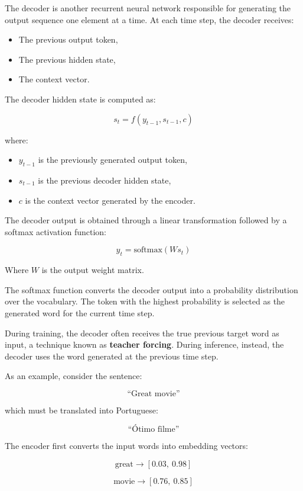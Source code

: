 The decoder is another recurrent neural network responsible for generating the output
sequence one element at a time. At each time step, the decoder receives:

\begin{itemize}
    \item The previous output token,
    \item The previous hidden state,
    \item The context vector.
\end{itemize}

The decoder hidden state is computed as:

\[
s_t = f(y_{t-1}, s_{t-1}, c)
\]

where:

\begin{itemize}
    \item $y_{t-1}$ is the previously generated output token,
    \item $s_{t-1}$ is the previous decoder hidden state,
    \item $c$ is the context vector generated by the encoder.
\end{itemize}

The decoder output is obtained through a linear transformation followed by a softmax
activation function:

\[
y_t = \text{softmax}(Ws_t)
\]

Where $W$ is the output weight matrix.

The softmax function converts the decoder output into a probability distribution over
the vocabulary. The token with the highest probability is selected as the generated
word for the current time step.

During training, the decoder often receives the true previous target word as input,
a technique known as \textbf{teacher forcing}. During inference, instead, the decoder
uses the word generated at the previous time step.

As an example, consider the sentence:

\[
\text{``Great movie''}
\]

which must be translated into Portuguese:

\[
\text{``Ótimo filme''}
\]

The encoder first converts the input words into embedding vectors:

\[
\text{great} \rightarrow [0.03,\ 0.98]
\]

\[
\text{movie} \rightarrow [0.76,\ 0.85]
\]

